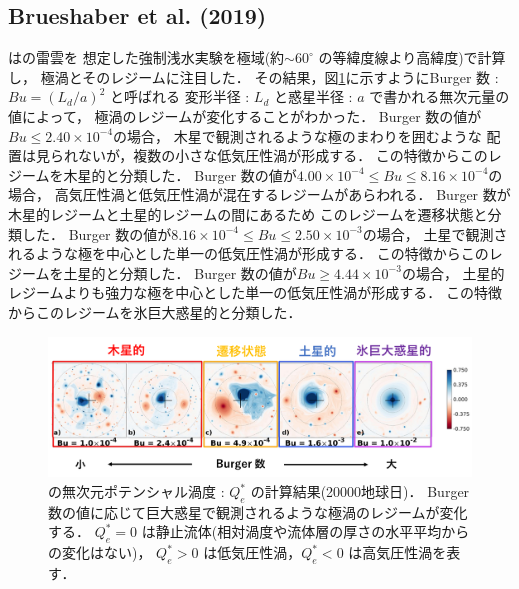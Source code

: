 \documentclass[a4j,12pt,openbib,oneside]{jreport}
\begin{document}
\subsection{Brueshaber et al. (2019)}
\label{sec:intro22}
\cite{Brueshaber2019}は\cite{Showman2007}の雷雲を
想定した強制浅水実験を極域(約$\sim 60^\circ$ の等緯度線より高緯度)で計算し，
極渦とそのレジームに注目した．
その結果，図\ref{fig4}に示すようにBurger 数 : $Bu = (L_d/a)^2$ と呼ばれる
変形半径 : $L_d$ と惑星半径 : $a$ で書かれる無次元量の値によって，
極渦のレジームが変化することがわかった．
%
Burger 数の値が$Bu \leq 2.40 \times 10^{-4}$の場合，
木星で観測されるような極のまわりを囲むような
配置は見られないが，複数の小さな低気圧性渦が形成する．
この特徴からこのレジームを木星的と分類した．
%
Burger 数の値が$4.00 \times 10^{-4 } \leq  Bu \leq  8.16 \times 10^{-4}$の場合，
高気圧性渦と低気圧性渦が混在するレジームがあらわれる．
Burger 数が木星的レジームと土星的レジームの間にあるため
このレジームを遷移状態と分類した．
%
Burger 数の値が$8.16 \times 10^{-4 } \leq Bu \leq  2.50 \times 10^{-3}$の場合，
土星で観測されるような極を中心とした単一の低気圧性渦が形成する．
この特徴からこのレジームを土星的と分類した．
%
Burger 数の値が$Bu \geq 4.44 \times 10^{-3 }$の場合，
土星的レジームよりも強力な極を中心とした単一の低気圧性渦が形成する．
この特徴からこのレジームを氷巨大惑星的と分類した．
%
\begin{figure}[H]
  \begin{center}
    \includegraphics[clip,width=14cm]{./fig/intro/fig4_1.png}
    \caption{
      \footnotesize{\cite{Brueshaber2019}の無次元ポテンシャル渦度 : $Q_e^*$ の計算結果(20000地球日)．
Burger 数の値に応じて巨大惑星で観測されるような極渦のレジームが変化する．
$Q_e^* = 0$ は静止流体(相対渦度や流体層の厚さの水平平均からの変化はない)，
$Q_e^* > 0$ は低気圧性渦，$Q_e^* < 0$ は高気圧性渦を表す．
      }
    }
    \label{fig4}
  \end{center}
\end{figure}
%
\def\intro3{研究目的}
\end{document}
